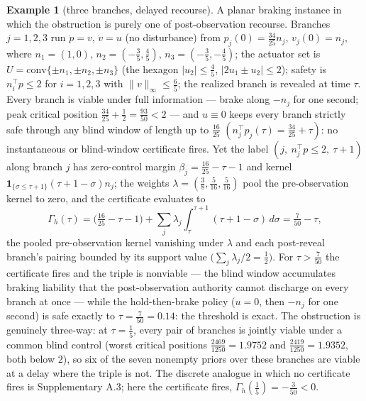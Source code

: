 \documentclass[10pt,twocolumn]{article}
\theoremstyle{definition}
\newtheorem{example}{Example}
\begin{document}
\begin{example}[three branches, delayed recourse]\label{calc-ex:three-branch}
A planar braking instance in which the obstruction is purely one of
post-observation recourse. Branches \(j = 1, 2, 3\) run \(\dot p = v\),
\(\dot v = u\) (no disturbance) from
\(p_j(0) = \tfrac{34}{25} n_j\), \(v_j(0) = n_j\), where
\(n_1 = (1, 0)\), \(n_2 = (-\tfrac{3}{5}, \tfrac{4}{5})\),
\(n_3 = (-\tfrac{3}{5}, -\tfrac{4}{5})\); the actuator set is
\(U = \mathrm{conv}\{\pm n_1, \pm n_2, \pm n_3\}\) (the hexagon
\(|u_2| \le \tfrac45\), \(|2u_1 \pm u_2| \le 2\)); safety is
\(n_i^{\top} p \le 2\) for \(i = 1, 2, 3\) with
\(\|v\|_\infty \le \tfrac65\); the realized branch is revealed at time
\(\tau\). Every branch is viable under full information --- brake along
\(-n_j\) for one second; peak critical position
\(\tfrac{34}{25} + \tfrac12 = \tfrac{93}{50} < 2\) --- and \(u \equiv 0\)
keeps every branch strictly safe through any blind window of length up to
\(\tfrac{16}{25}\) \((n_j^{\top} p_j(\tau) = \tfrac{34}{25} + \tau)\):
no instantaneous or blind-window certificate fires. Yet the label
\((j,\ n_j^{\top} p \le 2,\ \tau + 1)\) along branch \(j\) has
zero-control margin \(\beta_j = \tfrac{16}{25} - \tau - 1\) and kernel
\(\mathbf{1}_{\{\sigma \le \tau + 1\}} (\tau + 1 - \sigma) n_j\); the
weights \(\lambda = (\tfrac38, \tfrac5{16}, \tfrac5{16})\) pool the
pre-observation kernel to zero, and the certificate evaluates to \[\Gamma_{h}(\tau) = \Big(\tfrac{16}{25} - \tau - 1\Big) + \sum_{j} \lambda_{j} \int_{\tau}^{\tau+1} (\tau + 1 - \sigma)\, d\sigma = \tfrac{7}{50} - \tau,\] the pooled pre-observation kernel vanishing under \(\lambda\) and each post-reveal branch's pairing bounded by its support value \(\big(\sum_{j} \lambda_{j}/2 = \tfrac{1}{2}\big)\). For \(\tau > \tfrac{7}{50}\) the certificate fires and the triple is nonviable --- the blind window
accumulates braking liability that the post-observation authority cannot
discharge on every branch at once --- while the hold-then-brake policy
(\(u = 0\), then \(-n_j\) for one second) is safe exactly to
\(\tau = \tfrac{7}{50} = 0.14\): the threshold is exact. The obstruction
is genuinely three-way: at \(\tau = \tfrac15\), every pair of branches is
jointly viable under a common blind control (worst critical positions
\(\tfrac{2469}{1250} = 1.9752\) and \(\tfrac{2419}{1250} = 1.9352\), both
below \(2\)), so six of the seven nonempty priors over these branches are
viable at a delay where the triple is not. The discrete analogue in which no
certificate fires is Supplementary A.3; here the certificate fires, \(\Gamma_{h}(\tfrac15) = -\tfrac3{50} < 0\).
\end{example}
\end{document}
